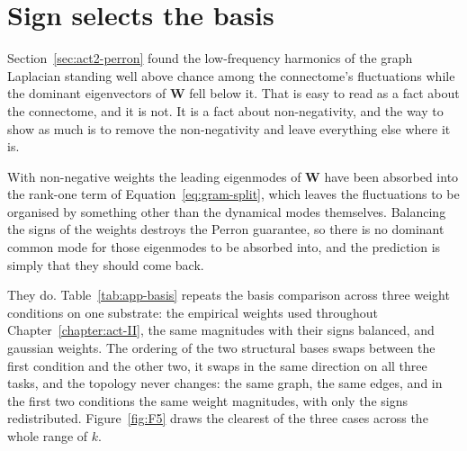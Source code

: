 \section{Sign selects the basis}
\label{app:sign-basis}
\bigskip

Section~\ref{sec:act2-perron} found the low-frequency harmonics of the graph
Laplacian standing well above chance among the connectome's fluctuations while
the dominant eigenvectors of $\mathbf{W}$ fell below it. That is easy to read as a fact
about the connectome, and it is not. It is a fact about non-negativity, and the
way to show as much is to remove the non-negativity and leave everything else
where it is.

With non-negative weights the leading eigenmodes of $\mathbf{W}$ have been absorbed into
the rank-one term of Equation~\ref{eq:gram-split}, which leaves the fluctuations
to be organised by something other than the dynamical modes themselves.
Balancing the signs of the weights destroys the Perron guarantee, so there is no
dominant common mode for those eigenmodes to be absorbed into, and the
prediction is simply that they should come back.

They do. Table~\ref{tab:app-basis} repeats the basis comparison across three
weight conditions on one substrate: the empirical weights used throughout
Chapter~\ref{chapter:act-II}, the same magnitudes with their signs balanced, and
gaussian weights. The ordering of the two structural bases swaps between the
first condition and the other two, it swaps in the same direction on all three
tasks, and the topology never changes: the same graph, the same edges, and in
the first two conditions the same weight magnitudes, with only the signs
redistributed. Figure~\ref{fig:F5} draws the clearest of the three cases across
the whole range of $k$.

